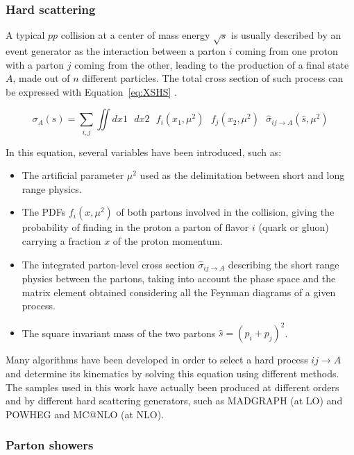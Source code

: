 \documentclass[a4paper, 10pt, openright]{report}
\begin{document}
\subsubsection*{Hard scattering}

A typical $pp$ collision at a center of mass energy $\sqrt{s}$ is usually described by an event generator as the interaction between a parton $i$ coming from one proton with a parton $j$ coming from the other, leading to the production of a final state $A$, made out of $n$ different particles. The total cross section of such process can be expressed with Equation~\ref{eq:XSHS} \cite{MCGen2}.

\begin{equation}
\label{eq:XSHS}
\sigma_A(s) = \sum_{i, j} \iint dx1 \text{ } dx2 \text{ } f_i(x_1, \mu^2) \text{ } f_j(x_2, \mu^2) \text{ } \hat{\sigma}_{ij \rightarrow A}(\hat{s}, \mu^2)
\end{equation}

In this equation, several variables have been introduced, such as:
\begin{itemize}
\item The artificial parameter $\mu^2$ used as the delimitation between short and long range physics.
\item The \acfp{PDF} $f_i(x, \mu^2)$ of both partons involved in the collision, giving the probability of finding in the proton a parton of flavor $i$ (quark or gluon) carrying a fraction $x$ of the proton momentum.
\item The integrated parton-level cross section $\hat{\sigma}_{ij \rightarrow A}$ describing the short range physics between the partons, taking into account the phase space and the matrix element obtained considering all the Feynman diagrams of a given process.
\item The square invariant mass of the two partons $\hat{s} = (p_i + p_j)^2$.
\end{itemize}

Many algorithms have been developed in order to select a hard process $ij \rightarrow A$ and determine its kinematics by solving this equation using different methods. The samples used in this work have actually been produced at different orders and by different hard scattering generators, such as MADGRAPH \cite{MADGRAPH} (at LO) and POWHEG \cite{POWHEG} and MC@NLO \cite{MCNLO} (at NLO).

\subsubsection*{Parton showers}
\end{document}
